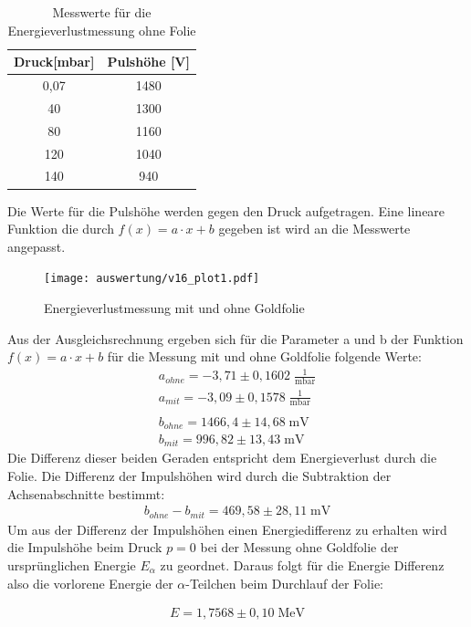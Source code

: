 \begin{table}[H] 
	\centering
	\begin{tabular}{c|c}

	Druck[mbar] & Pulshöhe  [V] \\ 
		\hline 
0,07	& 1480\\
40	& 1300\\
80	& 1160\\
120	& 1040\\
140	& 940\\
	
	\end{tabular} 
	\caption{Messwerte für die Energieverlustmessung ohne Folie } 
	\label{tab:ohne}
\end{table} 

Die Werte für die Pulshöhe werden gegen den Druck aufgetragen. Eine lineare Funktion die durch $f(x)=a\cdot x+b$ gegeben ist wird an die Messwerte angepasst.
\begin{figure}[h]
	\centering
	\texttt{[image: auswertung/v16\_plot1.pdf]}
	\caption{Energieverlustmessung mit und ohne Goldfolie}
	\label{img:grafik-dummy}
\end{figure}
\newpage 
Aus der Ausgleichsrechnung ergeben sich für die Parameter a und b der Funktion $f(x)=a\cdot x+b$ für die Messung mit und ohne Goldfolie folgende Werte: 
\begin{align*}
a_{ohne}= -3,71 \pm 0,1602 \; \frac{1}{\text{mbar}}
\\
a_{mit}= -3,09 \pm 0,1578 \; \frac{1}{\text{mbar}}
\\
\\
b_{ohne}= 1466,4 \pm 14,68 \; \text{mV}
\\
b_{mit}= 996,82 \pm  13,43 \; \text{mV}
\end{align*}
Die Differenz dieser beiden Geraden entspricht dem Energieverlust durch die Folie. Die Differenz der Impulshöhen wird durch die Subtraktion der Achsenabschnitte bestimmt: 
\begin{align}
b_{ohne}-b_{mit}= 469,58 \pm 28,11 \; \text{mV}
\end{align} 
Um aus der Differenz der Impulshöhen einen Energiedifferenz zu erhalten wird die Impulshöhe beim Druck $p=0$ bei der Messung ohne Goldfolie der ursprünglichen Energie $E_\alpha$ zu geordnet. Daraus folgt für die Energie Differenz also die vorlorene Energie der $\alpha$-Teilchen beim Durchlauf der Folie:

\begin{align*}
 E= 1,7568 \pm 0,10\;  \text{MeV}  
\end{align*} 

